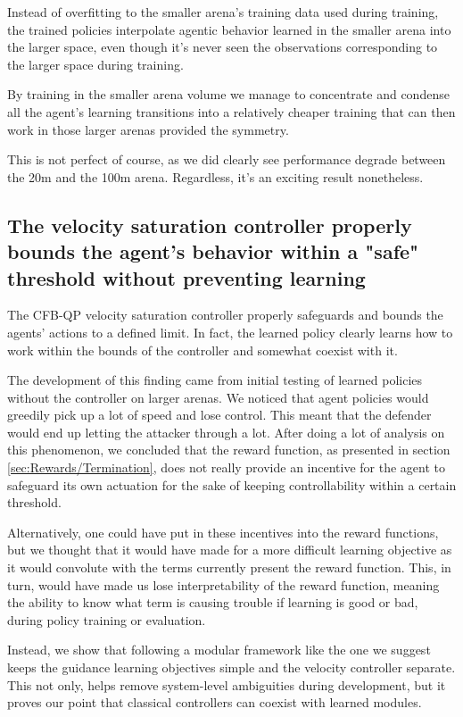 Instead of overfitting to the smaller arena's training data used during training, the trained policies interpolate agentic behavior learned in the smaller arena into the larger space, even though it's never seen the observations corresponding to the larger space during training.

 By training in the smaller arena volume we manage to concentrate and condense all the agent's learning transitions into a relatively cheaper training that can then work in those larger arenas provided the symmetry.

 This is not perfect of course, as we did clearly see performance degrade between the 20m and the 100m arena. Regardless, it's an exciting result nonetheless.


\subsection*{The velocity saturation controller properly bounds the agent's behavior within a "safe" threshold without preventing learning}

The CFB-QP velocity saturation controller properly safeguards and bounds the agents' actions to a defined limit. In fact, the learned policy clearly learns how to work within the bounds of the controller and somewhat coexist with it. 
    
The development of this finding came from initial testing of learned policies without the controller on larger arenas. We noticed that agent policies would greedily pick up a lot of speed and lose control. This meant that the defender would end up letting the attacker through a lot. After doing a lot of analysis on this phenomenon, we concluded that the reward function, as presented in section \ref{sec:Rewards/Termination}, does not really provide an incentive for the agent to safeguard its own actuation for the sake of keeping controllability within a certain threshold.

Alternatively, one could have put in these incentives into the reward functions, but we thought that it would have made for a more difficult learning objective as it would convolute with the terms currently present the reward function. This, in turn, would have made us lose interpretability of the reward function, meaning the ability to know what term is causing trouble if learning is good or bad, during policy training or evaluation.

Instead, we show that following a modular framework like the one we suggest keeps the guidance learning objectives simple and the velocity controller separate. This not only, helps remove system-level ambiguities during development, but it proves our point that classical controllers can coexist with learned modules.


